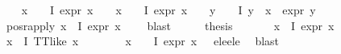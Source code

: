 \begin{isabellebody}
\ \ \isamarkupfalse%
\ {\isachardoublequoteopen}{\isacharparenleft}{\kern0pt}{\isasymforall}x\ {\isasymin}\ {\isacharparenleft}{\kern0pt}{\isasymPhi}\ {\isacharbackquote}{\kern0pt}\ I{\isacharparenright}{\kern0pt}{\isachardot}{\kern0pt}\ expr{\isacharunderscore}{\kern0pt}{}\ x\ {\isasymle}\ {}{\isacharparenright}{\kern0pt}\ {\isasymor}\ {\isacharparenleft}{\kern0pt}{\isasymexists}x\ {\isasymin}\ {\isasymPhi}\ {\isacharbackquote}{\kern0pt}\ I{\isachardot}{\kern0pt}\ expr{\isacharunderscore}{\kern0pt}{}\ x\ {\isasymle}\ {}\ {\isasymand}\ {\isacharparenleft}{\kern0pt}{\isasymforall}y\ {\isasymin}\ {\isasymPhi}\ {\isacharbackquote}{\kern0pt}\ I{\isachardot}{\kern0pt}\ y\ {\isasymnoteq}\ x\ {\isasymlongrightarrow}\ expr{\isacharunderscore}{\kern0pt}{}\ y\ {\isasymle}\ {}{\isacharparenright}{\kern0pt}{\isacharparenright}{\kern0pt}{\isachardoublequoteclose}\isanewline
\ \ \ \ \isamarkupfalse%
\ pos{\isacharunderscore}{\kern0pt}r{\isacharunderscore}{\kern0pt}apply\ {\isacartoucheopen}{\isasymforall}x{\isasymin}{\isasymPhi}\ {\isacharbackquote}{\kern0pt}\ I{\isachardot}{\kern0pt}\ expr{\isacharunderscore}{\kern0pt}{}\ x\ {\isasymle}\ {}{\isacartoucheclose}\ \isamarkupfalse%
\ blast\isanewline
\ \ \isamarkupfalse%
\ \isamarkupfalse%
\ {\isacharquery}{\kern0pt}thesis\ \isamarkupfalse%
\isanewline
\ \ \ \ \isamarkupfalse%
\ {\isachardoublequoteopen}{\isasymforall}x{\isasymin}{\isasymPhi}\ {\isacharbackquote}{\kern0pt}\ I{\isachardot}{\kern0pt}\ expr{\isacharunderscore}{\kern0pt}{}\ x\ {\isasymle}\ {}{\isachardoublequoteclose}\isanewline
\ \ \ \ \isamarkupfalse%
\ {\isachardoublequoteopen}{\isasymforall}x{\isasymin}{\isasymPhi}\ {\isacharbackquote}{\kern0pt}\ I{\isachardot}{\kern0pt}\ TT{\isacharunderscore}{\kern0pt}like\ x{\isachardoublequoteclose}\isanewline
\ \ \ \ \ \ \isamarkupfalse%
\ {\isacartoucheopen}{\isasymforall}x\ {\isasymin}\ {\isasymPhi}\ {\isacharbackquote}{\kern0pt}\ I{\isachardot}{\kern0pt}\ expr{\isacharunderscore}{\kern0pt}{}\ x\ {\isasymle}\ {}{\isacartoucheclose}\ e{}{\isacharunderscore}{\kern0pt}le{\isacharunderscore}{\kern0pt}{}{\isacharunderscore}{\kern0pt}e{}{\isacharunderscore}{\kern0pt}le{\isacharunderscore}{\kern0pt}{}\ \isamarkupfalse%
\ blast\isanewline
\ \ \ \ \isamarkupfalse%

\end{isabellebody}
